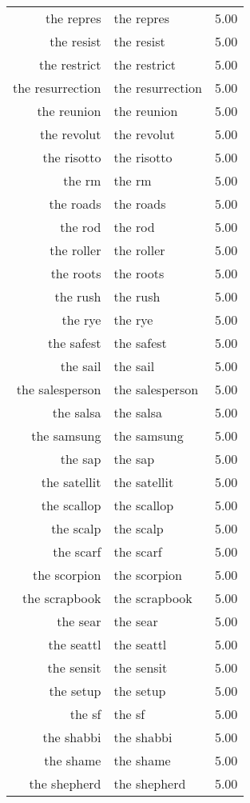 \begin{table}[ht]
\begin{tabular}{rlr}
  the repres & the repres & 5.00 \\ 
  the resist & the resist & 5.00 \\ 
  the restrict & the restrict & 5.00 \\ 
  the resurrection & the resurrection & 5.00 \\ 
  the reunion & the reunion & 5.00 \\ 
  the revolut & the revolut & 5.00 \\ 
  the risotto & the risotto & 5.00 \\ 
  the rm & the rm & 5.00 \\ 
  the roads & the roads & 5.00 \\ 
  the rod & the rod & 5.00 \\ 
  the roller & the roller & 5.00 \\ 
  the roots & the roots & 5.00 \\ 
  the rush & the rush & 5.00 \\ 
  the rye & the rye & 5.00 \\ 
  the safest & the safest & 5.00 \\ 
  the sail & the sail & 5.00 \\ 
  the salesperson & the salesperson & 5.00 \\ 
  the salsa & the salsa & 5.00 \\ 
  the samsung & the samsung & 5.00 \\ 
  the sap & the sap & 5.00 \\ 
  the satellit & the satellit & 5.00 \\ 
  the scallop & the scallop & 5.00 \\ 
  the scalp & the scalp & 5.00 \\ 
  the scarf & the scarf & 5.00 \\ 
  the scorpion & the scorpion & 5.00 \\ 
  the scrapbook & the scrapbook & 5.00 \\ 
  the sear & the sear & 5.00 \\ 
  the seattl & the seattl & 5.00 \\ 
  the sensit & the sensit & 5.00 \\ 
  the setup & the setup & 5.00 \\ 
  the sf & the sf & 5.00 \\ 
  the shabbi & the shabbi & 5.00 \\ 
  the shame & the shame & 5.00 \\ 
  the shepherd & the shepherd & 5.00 \\ 

\end{tabular}
\end{table}

